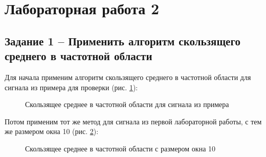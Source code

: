 \documentclass[a4paper,oneside,14pt]{extreport}
\begin{document}
\chapter*{Лабораторная работа 2}
\section*{Задание 1 – Применить алгоритм скользящего среднего в частотной области}

Для начала применим алгоритм скользящего среднего в частотной области для сигнала из примера для проверки (рис. \ref{task1_not_my_signal}):

\begin{figure}[h]
	\caption{Скользящее среднее в частотной области для сигнала из примера}
	\label{task1_not_my_signal}
\end{figure}

\newpage
Потом применим тот же метод для сигнала из первой лабораторной работы, с тем же размером окна 10 (рис. \ref{task1_my_signal}):

\begin{figure}[h]
	\caption{Скользящее среднее в частотной области с размером окна 10}
	\label{task1_my_signal}
\end{figure}
\end{document}
